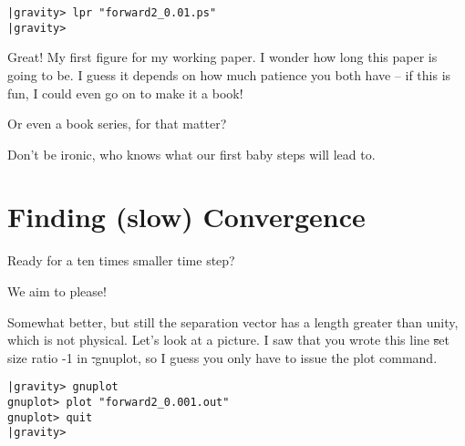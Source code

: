 \cba

\begin{small}
\begin{verbatim}
|gravity> lpr "forward2_0.01.ps"
|gravity>
\end{verbatim}
\end{small}

\abc

\alice
Great!  My first figure for my working paper.  I wonder how long this
paper is going to be.  I guess it depends on how much patience you
both have -- if this is fun, I could even go on to make it a book!

\bob
Or even a book series, for that matter?

\carol
Don't be ironic, who knows what our first baby steps will lead to.

\cba

\section{Finding (slow) Convergence}

\abc

\alice
Ready for a ten times smaller time step?

\carol
We aim to please!

\cba


\abc

\bob
Somewhat better, but still the separation vector has a length greater
than unity, which is not physical.  Let's look at a picture.  I saw
that you wrote this line {\st set size ratio -1} in {\st .gnuplot}, so
I guess you only have to issue the plot command.

\cba

\begin{small}
\begin{verbatim}
|gravity> gnuplot
gnuplot> plot "forward2_0.001.out"
gnuplot> quit
|gravity> 
\end{verbatim}
\end{small}

